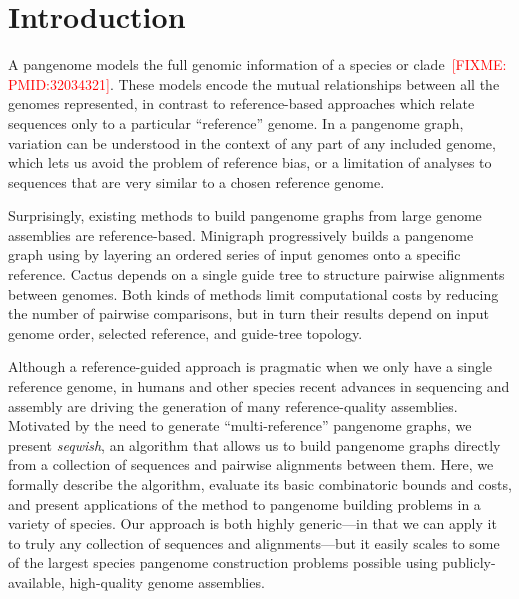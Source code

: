 \documentclass{bioinfo}
\newcommand{\red}[1]{{\textcolor{Red}{#1}}}
\newcommand{\FIXME}[1]{\red{[FIXME: #1]}}
\begin{document}
\maketitle


\section{Introduction}
\label{sec:introduction}
A pangenome models the full genomic information of a species or clade~\FIXME{PMID:32034321}.
These models encode the mutual relationships between all the genomes represented, in contrast to reference-based approaches which relate sequences only to a particular ``reference'' genome.
In a pangenome graph, variation can be understood in the context of any part of any included genome, which lets us avoid the problem of reference bias, or a limitation of analyses to sequences that are very similar to a chosen reference genome.

Surprisingly, existing methods to build pangenome graphs from large genome assemblies are reference-based.
Minigraph progressively builds a pangenome graph using by layering an ordered series of input genomes onto a specific reference.
Cactus depends on a single guide tree to structure pairwise alignments between genomes.
Both kinds of methods limit computational costs by reducing the number of pairwise comparisons, but in turn their results depend on input genome order, selected reference, and guide-tree topology.

Although a reference-guided approach is pragmatic when we only have a single reference genome, in humans and other species recent advances in sequencing and assembly are driving the generation of many reference-quality assemblies.
Motivated by the need to generate ``multi-reference'' pangenome graphs, we present \textit{seqwish}, an algorithm that allows us to build pangenome graphs directly from a collection of sequences and pairwise alignments between them.
Here, we formally describe the algorithm, evaluate its basic combinatoric bounds and costs, and present applications of the method to pangenome building problems in a variety of species.
Our approach is both highly generic---in that we can apply it to truly any collection of sequences and alignments---but it easily scales to some of the largest species pangenome construction problems possible using publicly-available, high-quality genome assemblies.
\end{document}
